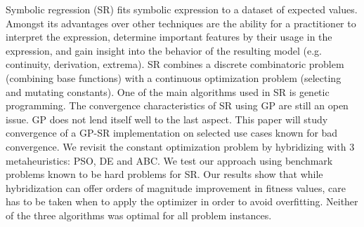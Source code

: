 Symbolic regression (SR) fits symbolic expression to a dataset of expected values. Amongst its advantages over other techniques are the ability for a practitioner to interpret the expression, determine important features by their usage in the expression, and gain insight into the behavior of the resulting model (e.g. continuity, derivation, extrema). SR combines a discrete combinatoric problem (combining base functions) with a continuous optimization problem (selecting and mutating constants). One of the main algorithms used in SR is genetic programming. The convergence characteristics of SR using GP are still an open issue. GP does not lend itself well to the last aspect. This paper will study convergence of a GP-SR implementation on selected use cases known for bad convergence. We revisit the constant optimization problem by hybridizing with 3 metaheuristics: PSO, DE and ABC. We test our approach using benchmark problems known to be hard problems for SR.
Our results show that while hybridization can offer orders of magnitude improvement in fitness values, care has to be taken when to apply the optimizer in order to avoid overfitting. Neither of the three algorithms was optimal for all problem instances.